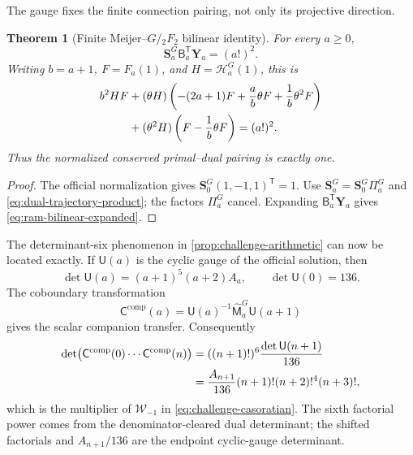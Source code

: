 \documentclass[11pt]{article}
\theoremstyle{keio}
\newtheorem{theorem}{Theorem}[section]
\theoremstyle{definition}
\theoremstyle{remark}
\begin{document}
The gauge fixes the finite connection pairing, not only its projective
direction.

\begin{theorem}[Finite Meijer--\(G\)/\({}_2F_2\) bilinear identity]
\label{thm:ram-bilinear}
For every \(a\ge0\),
\begin{equation}\label{eq:ram-bilinear-matrix}
 \boxed{\displaystyle
 \mathbf S_a^G\mathsf B_a^{\mathsf T}\mathbf Y_a=(a!)^2.}
\end{equation}
Writing \(b=a+1\), \(F=F_a(1)\), and
\(H=\mathcal H_a^G(1)\), this is
\begin{align}
 b^2HF
 &+(\theta H)\left(-(2a+1)F+\frac ab\theta F
                         +\frac1b\theta^2F\right)\notag\\
 &+(\theta^2H)\left(F-\frac1b\theta F\right)=(a!)^2.
 \label{eq:ram-bilinear-expanded}
\end{align}
Thus the normalized conserved primal--dual pairing is exactly one.
\end{theorem}

\begin{proof}
The official normalization gives
\(\mathbf S_0^G(1,-1,1)^{\mathsf T}=1\).  Use
\(\mathbf S_a^G=\mathbf S_0^G\Pi_a^G\) and
\eqref{eq:dual-trajectory-product}; the factors \(\Pi_a^G\) cancel.
Expanding \(\mathsf B_a^{\mathsf T}\mathbf Y_a\) gives
\eqref{eq:ram-bilinear-expanded}.
\end{proof}

The determinant-six phenomenon in \cref{prop:challenge-arithmetic} can now
be located exactly.  If \(\mathsf U(a)\) is the cyclic gauge of the official
solution, then
\begin{equation}\label{eq:cyclic-gauge-det}
 \det\mathsf U(a)=(a+1)^5(a+2)A_a,\qquad \det\mathsf U(0)=136.
\end{equation}
The coboundary transformation
\begin{equation}\label{eq:companion-gauge-definition}
 \mathsf C^{\mathrm{comp}}(a)=
 \mathsf U(a)^{-1}\widehat{\mathsf M}_a^G\mathsf U(a+1)
\end{equation}
gives the scalar companion transfer.  Consequently
\begin{align}
 \det\bigl(\mathsf C^{\mathrm{comp}}(0)\cdots
                 \mathsf C^{\mathrm{comp}}(n)\bigr)
 &=((n+1)!)^6\frac{\det\mathsf U(n+1)}{136}\notag\\
 &=\frac{A_{n+1}}{136}(n+1)!(n+2)!^4(n+3)!,
 \label{eq:casoratian-gauge-origin}
\end{align}
which is the multiplier of \(\mathcal W_{-1}\) in
\eqref{eq:challenge-casoratian}.  The sixth factorial power comes from the
denominator-cleared dual determinant; the shifted factorials and
\(A_{n+1}/136\) are the endpoint cyclic-gauge determinant.
\end{document}
